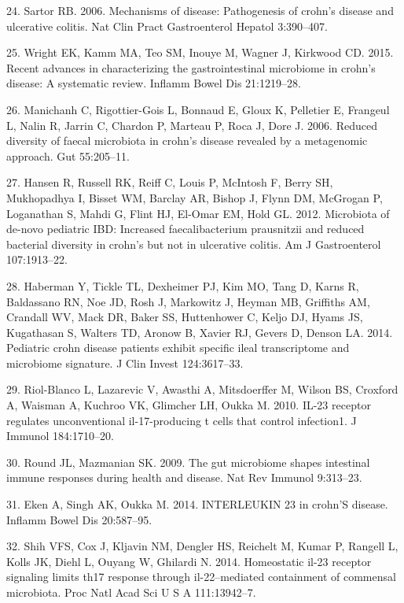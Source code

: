 \documentclass[11pt,]{article}
\begin{document}
\hypertarget{ref-sartor_IBDpath_2006}{}
24. Sartor RB. 2006. Mechanisms of disease: Pathogenesis of crohn's
disease and ulcerative colitis. Nat Clin Pract Gastroenterol Hepatol
3:390--407.

\hypertarget{ref-wright_CDmicrobiome_2015}{}
25. Wright EK, Kamm MA, Teo SM, Inouye M, Wagner J, Kirkwood CD. 2015.
Recent advances in characterizing the gastrointestinal microbiome in
crohn's disease: A systematic review. Inflamm Bowel Dis 21:1219--28.

\hypertarget{ref-manichanh_diversityCD_2006}{}
26. Manichanh C, Rigottier-Gois L, Bonnaud E, Gloux K, Pelletier E,
Frangeul L, Nalin R, Jarrin C, Chardon P, Marteau P, Roca J, Dore J.
2006. Reduced diversity of faecal microbiota in crohn's disease revealed
by a metagenomic approach. Gut 55:205--11.

\hypertarget{ref-hansen_pedsIBD_2012}{}
27. Hansen R, Russell RK, Reiff C, Louis P, McIntosh F, Berry SH,
Mukhopadhya I, Bisset WM, Barclay AR, Bishop J, Flynn DM, McGrogan P,
Loganathan S, Mahdi G, Flint HJ, El-Omar EM, Hold GL. 2012. Microbiota
of de-novo pediatric IBD: Increased faecalibacterium prausnitzii and
reduced bacterial diversity in crohn's but not in ulcerative colitis. Am
J Gastroenterol 107:1913--22.

\hypertarget{ref-haberman_pedsCD_2014}{}
28. Haberman Y, Tickle TL, Dexheimer PJ, Kim MO, Tang D, Karns R,
Baldassano RN, Noe JD, Rosh J, Markowitz J, Heyman MB, Griffiths AM,
Crandall WV, Mack DR, Baker SS, Huttenhower C, Keljo DJ, Hyams JS,
Kugathasan S, Walters TD, Aronow B, Xavier RJ, Gevers D, Denson LA.
2014. Pediatric crohn disease patients exhibit specific ileal
transcriptome and microbiome signature. J Clin Invest 124:3617--33.

\hypertarget{ref-Riol-Blanco_IL23microbiome_2010}{}
29. Riol-Blanco L, Lazarevic V, Awasthi A, Mitsdoerffer M, Wilson BS,
Croxford A, Waisman A, Kuchroo VK, Glimcher LH, Oukka M. 2010. IL-23
receptor regulates unconventional il-17-producing t cells that control
infection1. J Immunol 184:1710--20.

\hypertarget{ref-Round_IL23microbiome_2009}{}
30. Round JL, Mazmanian SK. 2009. The gut microbiome shapes intestinal
immune responses during health and disease. Nat Rev Immunol 9:313--23.

\hypertarget{ref-Eken_IL23CD_2014}{}
31. Eken A, Singh AK, Oukka M. 2014. INTERLEUKIN 23 in crohn'S disease.
Inflamm Bowel Dis 20:587--95.

\hypertarget{ref-Shih_IL23Th17_2014}{}
32. Shih VFS, Cox J, Kljavin NM, Dengler HS, Reichelt M, Kumar P,
Rangell L, Kolls JK, Diehl L, Ouyang W, Ghilardi N. 2014. Homeostatic
il-23 receptor signaling limits th17 response through il-22--mediated
containment of commensal microbiota. Proc Natl Acad Sci U S A
111:13942--7.
\end{document}
